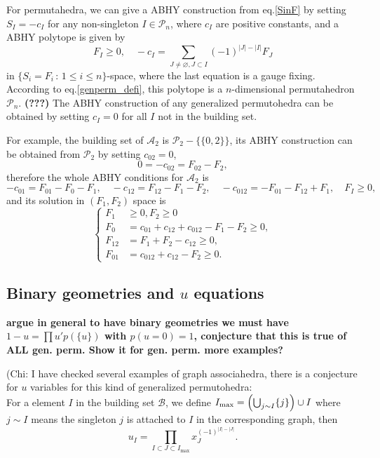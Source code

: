 \documentclass[hidelinks,12pt]{article}
\begin{document}
For permutahedra, we can give a ABHY construction from eq.\eqref{SinF} by setting 
$S_I=-c_I$ for any non-singleton $I\in \mathscr P_n$, where $c_I$ are positive 
constants, and a ABHY polytope is given by 
\begin{equation}\label{ABHY}
	F_I\geq 0,\quad -c_I=\sum_{J\neq \varnothing,J\subset I}(-1)^{|J|-|I|}F_J
\end{equation}
in $\{S_i=F_i\,:\,1\leq i\leq n\}$-space, where the last equation is a gauge fixing. 
According to eq.\eqref{genperm_defi}, this polytope is a $n$-dimensional 
permutahedron $\mathscr P_n$. {\bf (???)}
The ABHY construction of any generalized permutohedra can be obtained by 
setting $c_I=0$ for all $I$ not in the building set.

For example, the building set of $\mathscr A_2$ is $\mathscr P_2-\{\{0,2\}\}$,
its ABHY construction can be obtained from $\mathscr P_2$ by setting $c_{02}=0$, 
\[
	0=-c_{02}=F_{02}-F_2,
\]
therefore the whole ABHY conditions for $\mathscr A_2$ is 
\[
	-c_{01}=F_{01}-F_0-F_1,\quad -c_{12}=F_{12}-F_1-F_2,\quad 
	-c_{012}=-F_{01}-F_{12}+F_1,\quad F_I\geq 0,
\]
and its solution in $(F_1,F_2)$ space is 
\[
	\left\{\begin{aligned}
		F_1&\geq 0,F_2\geq 0\\
		F_0&=c_{01}+c_{12}+c_{012}-F_1-F_2\geq 0,\\
		F_{12}&=F_1+F_2-c_{12}\geq 0,\\
		F_{01}&=c_{012}+c_{12}-F_2\geq 0.
	\end{aligned}\right.
\]

\subsection{Binary geometries and $u$ equations}

{\bf argue in general to have binary geometries we must have $1-u=\prod u' p(\{u\})$ with $p(u=0)=1$, conjecture that this is true of ALL gen. perm. Show it for gen. perm. more examples?}


(Chi: I have checked several examples of graph associahedra, there is a conjecture for $u$ variables for this kind of generalized permutohedra: \\
For a element $I$ in the building set $\mathcal{B}$, we define $I_{\text{max}}=\Bigl(\bigcup_{j\sim I} \{j\} \Bigr)\cup I$
where $j\sim I$ means the singleton $j$ is attached to $I$ in the corresponding graph, then 
\begin{equation}
   u_{I} = \prod_{ I \subset J \subset I_{\text{max}}}x_J^{(-1)^{|I|-|J|}}. \label{uvarforgraph}
\end{equation}
\end{document}
